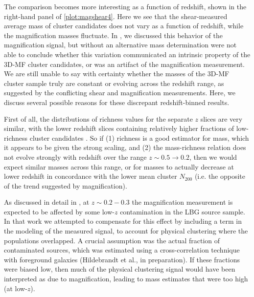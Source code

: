The comparison becomes more interesting as a function of redshift, shown in the right-hand panel of \autoref{plot:magshear4}. Here we see that the shear-measured average mass of cluster candidates does not vary as a function of redshift, while the magnification masses fluctuate. In \citet{Ford14}, we discussed this behavior of the magnification signal, but without an alternative mass determination were not able to conclude whether this variation communicated an intrinsic property of the \ac{3D-MF} cluster candidates, or was an artifact of the magnification measurement. We are still unable to say with certainty whether the masses of the \ac{3D-MF} cluster sample truly are constant or evolving across the redshift range, as suggested by the conflicting shear and magnification measurements. Here, we discuss several possible reasons for these discrepant redshift-binned results. 

First of all, the distributions of richness values for the separate $z$ slices are very similar, with the lower redshift slices containing relatively higher fractions of low-richness cluster candidates \citep[see Figure 7 in][]{Ford14}. So if (1) richness is a good estimator for mass, which it appears to be given the strong scaling, and (2) the mass-richness relation does not evolve strongly with redshift over the range $z \sim 0.5 \rightarrow 0.2$, then we would expect similar masses across this range, or for masses to actually decrease at lower redshift in concordance with the lower mean cluster $N_{200}$ (i.e. the opposite of the trend suggested by magnification).

As discussed in detail in \citet{Ford14}, at $z \sim 0.2-0.3$ the magnification measurement is expected to be affected by some low-$z$ contamination in the \ac{LBG} source sample. In that work we attempted to compensate for this effect by including a term in the modeling of the measured signal, to account for physical clustering where the populations overlapped. A crucial assumption was the actual fraction of contaminated sources, which was estimated using a cross-correlation technique with foreground galaxies (Hildebrandt et al., in preparation). If these fractions were biased low, then much of the physical clustering signal would have been interpreted as due to magnification, leading to mass estimates that were too high (at low-$z$).

